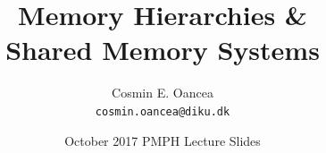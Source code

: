 \documentclass{beamer}
\title[Shared Memory Systems]{Memory Hierarchies \& \\Shared Memory Systems}
\author[C.~Oancea]{Cosmin E. Oancea\\{\tt cosmin.oancea@diku.dk}}
\institute{Department of Computer Science (DIKU)\\University of Copenhagen}
\date[Oct 2017]{October 2017 PMPH Lecture Slides}
\newcommand{\emp}[1]{\textcolor{DikuRed}{ #1}}
\begin{document}
\titleslide




\begin{frame}[fragile]
	\tableofcontents
\end{frame}

%
%
\end{document}
